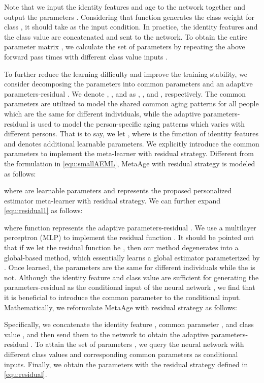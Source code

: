 \documentclass[journal,twoside]{IEEEtran}
\begin{document}
Note that we input the identity features  and age  to the network together and output the parameters . Considering that function  generates the class weight  for class , it should take  as the input condition. In practice, the identity features  and the class value  are concatenated and sent to the network. To obtain the entire parameter matrix , we calculate the set of parameters  by repeating the above forward pass  times with different class value inputs .


To further reduce the learning difficulty and improve the training stability, we consider decomposing the parameters  into common parameters   and an adaptive parameters-residual . We denote , , and  as , , and , respectively. The common parameters  are utilized to model the shared common aging patterns for all people which are the same for different individuals, while the adaptive parameters-residual  is used to model the person-specific aging patterns which varies with different persons. That is to say, we let , where  is the function of identity features  and  denotes additional learnable parameters.  We explicitly introduce the common parameters  to implement the meta-learner with residual strategy. Different from the formulation in \eqref{equ:smallAEML}, MetaAge with residual strategy is modeled as follows:

where  are learnable parameters and  represents the proposed personalized estimator meta-learner with residual strategy. 
We can further expand \eqref{equ:residual1} as follows:

where function  represents the adaptive parameters-residual . We use a multilayer perceptron (MLP) to implement the residual function . It should be pointed out that if we let the residual function  be , then our method degenerates into a global-based method, which essentially learns a global estimator parameterized by . Once learned, the parameters  are the same for different individuals while the  is not.
Although the identity feature  and class value  are sufficient for generating the parameters-residual  as the conditional input of the neural network , we find that it is beneficial to introduce the common parameter  to the conditional input.
Mathematically, we reformulate MetaAge with residual strategy as follows:

Specifically, we concatenate the identity feature ,  common parameter , and class value , and then send them to the network  to obtain the adaptive parameters-residual . To attain the set of parameters , we query the neural network  with different class values  and corresponding common parameters  as conditional inputs. 
Finally, we obtain the parameters  with the residual strategy defined in \eqref{equ:residual}.
\end{document}

